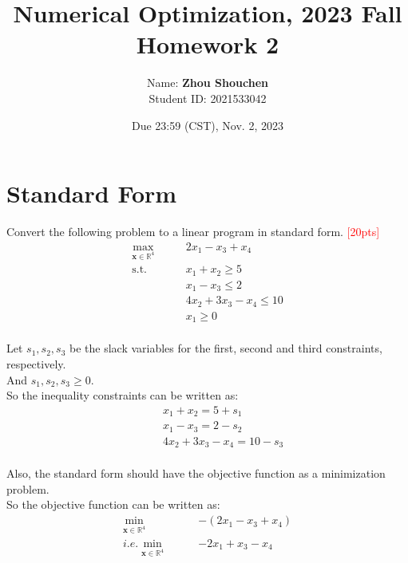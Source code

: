 \documentclass[10pt]{article}
\begin{document}
\title{	Numerical Optimization, 2023 Fall\\Homework 2}
\date{Due 23:59 (CST), Nov. 2, 2023 }

\author{
    Name: \textbf{Zhou Shouchen} \\
	Student ID: 2021533042
}

\maketitle

\newpage

\section{Standard Form}
Convert the following problem to a linear program in standard form. \textcolor{red}{[20pts]}~
\begin{equation}
	\begin{aligned}
		\max_{\bm{x} \in \mathbb{R}^{4}}\qquad & 2x_{1} - x_{3} + x_{4} \\
		\mathrm{s.t.}\qquad & x_{1} + x_{2} \geq 5 \\
							& x_{1} - x_{3} \leq 2 \\
                                & 4x_{2} + 3x_{3} - x_{4} \leq 10 \\
                                & x_{1} \geq 0 \\
	\end{aligned}
\end{equation}

Let $s_1,s_2,s_3$ be the slack variables for the first, second and third constraints, respectively.\\
And $s_1,s_2,s_3\geq 0$.\\
So the inequality constraints can be written as:\\
\begin{equation}
	\begin{aligned}
		 \qquad & x_{1} + x_{2} = 5 + s_1 \\
				& x_{1} - x_{3} = 2 - s_2 \\
				& 4x_{2} + 3x_{3} - x_{4} = 10 - s_3 \\
	\end{aligned}
\end{equation}

Also, the standard form should have the objective function as a minimization problem.\\
So the objective function can be written as:\\
\begin{equation}
	\begin{aligned}
		\min_{\bm{x} \in \mathbb{R}^{4}}\qquad & -(2x_{1} - x_{3} + x_{4}) \\
		i.e.
		\min_{\bm{x} \in \mathbb{R}^{4}}\qquad & -2x_{1} + x_{3} - x_{4} \\
	\end{aligned}
\end{equation}
\end{document}
